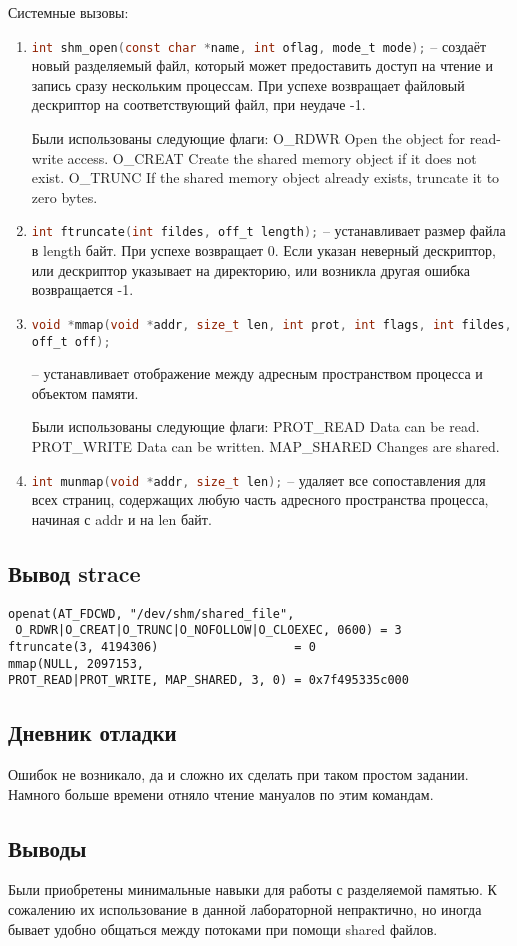 \documentclass[12pt]{article}
\begin{document}
\noindent Системные вызовы:
\begin{enumerate}
    \item \lstinline[language=c]|int shm_open(const char *name, int oflag, mode_t mode);|  -- создаёт новый разделяемый файл, который может предоставить доступ на чтение и запись сразу нескольким процессам. При успехе возвращает файловый дескриптор на соответствующий файл, при неудаче -1.
     
    Были использованы следующие флаги:
    \subitem O\_RDWR    Open the object for read-write access.
    \subitem O\_CREAT    Create  the shared memory object if it does not exist.
    \subitem O\_TRUNC    If the shared memory object already exists, truncate it to zero bytes.
    
    
    \item  \lstinline[language=c]|int ftruncate(int fildes, off_t length);| -- устанавливает размер файла в length байт. При успехе возвращает 0. Если указан неверный дескриптор, или дескриптор указывает на директорию, или возникла другая ошибка возвращается -1.
    \item \lstinline[language=c]|void *mmap(void *addr, size_t len, int prot, int flags, int fildes, off_t off);| 
    
    -- устанавливает отображение между адресным пространством процесса и объектом памяти.
         
    Были использованы следующие флаги:
    \subitem PROT\_READ   Data can be read.
    \subitem PROT\_WRITE   Data can be written. 
    \subitem MAP\_SHARED    Changes are shared. 
    \item \lstinline[language=c]|int munmap(void *addr, size_t len);|  -- удаляет все сопоставления для всех страниц, содержащих любую часть адресного пространства процесса, начиная с addr и на len байт.
\end{enumerate}

\subsection*{Вывод strace}
{\begin{lstlisting}
openat(AT_FDCWD, "/dev/shm/shared_file",
 O_RDWR|O_CREAT|O_TRUNC|O_NOFOLLOW|O_CLOEXEC, 0600) = 3
ftruncate(3, 4194306)                   = 0
mmap(NULL, 2097153, 
PROT_READ|PROT_WRITE, MAP_SHARED, 3, 0) = 0x7f495335c000
\end{lstlisting}}

\subsection*{Дневник отладки}

Ошибок не возникало, да и сложно их сделать при таком простом задании. Намного больше времени отняло чтение мануалов по этим командам.

\subsection*{Выводы}

Были приобретены минимальные навыки для работы с разделяемой памятью. К сожалению их использование в данной лабораторной непрактично, но иногда бывает удобно общаться между потоками при помощи shared файлов.
\end{document}
